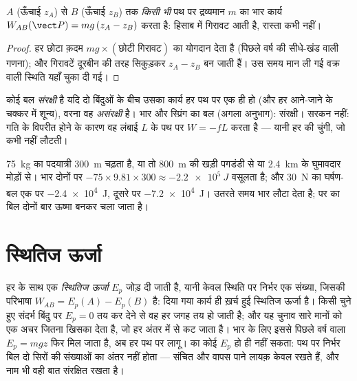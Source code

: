 \begin{proposition}[भार का कार्य, किसी भी पथ पर]\label{prop:g12:work-and-energy:weight}
$A$ (ऊँचाई $z_A$) से $B$ (ऊँचाई $z_B$) तक \emph{किसी भी} पथ पर
द्रव्यमान $m$ का भार कार्य $W_{AB}(\vect P) = mg\,(z_A - z_B)$ करता है: हिसाब में गिरावट
आती है, रास्ता कभी नहीं।
\end{proposition}

\begin{proof}
हर छोटा क़दम $mg \times (\text{छोटी गिरावट})$ का योगदान देता है (पिछले वर्ष की सीधे-खंड वाली गणना); और
गिरावटें दूरबीन की तरह सिकुड़कर $z_A - z_B$ बन जाती हैं। उस समय मान ली गई वक्र वाली
स्थिति यहाँ चुका दी गई।
\end{proof}

\begin{definition}[संरक्षी और असंरक्षी बल]\label{def:g12:work-and-energy:conservative}
कोई बल \emph{संरक्षी} है यदि दो बिंदुओं के बीच उसका
कार्य हर पथ पर एक ही हो (और हर आने-जाने के चक्कर में शून्य), वरना वह
\emph{असंरक्षी} है। भार और स्प्रिंग का बल
(अगला अनुभाग): संरक्षी। सरकन  नहीं: गति के विपरीत होने के कारण वह
लंबाई $L$ के पथ पर $W = -fL$ करता है --- यानी हर  की चुंगी, जो कभी
नहीं लौटती।
\end{definition}

\begin{example}[कुटिया तक दो पगडंडियाँ]\label{ex:g12:work-and-energy:trails}
\qty{75}{kg} का पदयात्री \qty{300}{m} चढ़ता है, या तो \qty{800}{m} की खड़ी पगडंडी से या \qty{2.4}{km} के
घुमावदार मोड़ों से। भार दोनों पर $-75 \times 9.81 \times 300 \approx \qty{-2.2e5}{J}$ वसूलता है; और \qty{30}{N} का
घर्षण-बल एक पर \qty{-2.4e4}{J}, दूसरे पर \qty{-7.2e4}{J}। उतरते समय भार
लौटा देता है; पर  का बिल दोनों बार ऊष्मा बनकर चला जाता है।
\end{example}

\section{स्थितिज ऊर्जा}

\begin{definition}[स्थितिज ऊर्जा]\label{def:g12:work-and-energy:ep}
हर  के साथ एक \emph{स्थितिज ऊर्जा} $E_p$ जोड़ दी जाती है, यानी केवल स्थिति पर निर्भर एक संख्या, जिसकी
परिभाषा $W_{AB} = E_p(A) - E_p(B)$ है: दिया गया कार्य ही ख़र्च हुई स्थितिज ऊर्जा
है। किसी चुने हुए संदर्भ बिंदु पर $E_p = 0$ तय कर देने से वह हर जगह तय हो जाती
है; और यह चुनाव सारे मानों को एक अचर जितना खिसका देता है, जो हर अंतर में से कट
जाता है। भार के लिए इससे पिछले वर्ष वाला $E_p = mgz$ फिर मिल जाता है, अब हर
पथ पर लागू।  का कोई $E_p$ हो ही नहीं सकता: पथ पर निर्भर बिल दो
सिरों की संख्याओं का अंतर नहीं होता --- संचित और वापस पाने लायक़ केवल
 रखते हैं, और नाम भी वही बात संरक्षित रखता है।
\end{definition}

